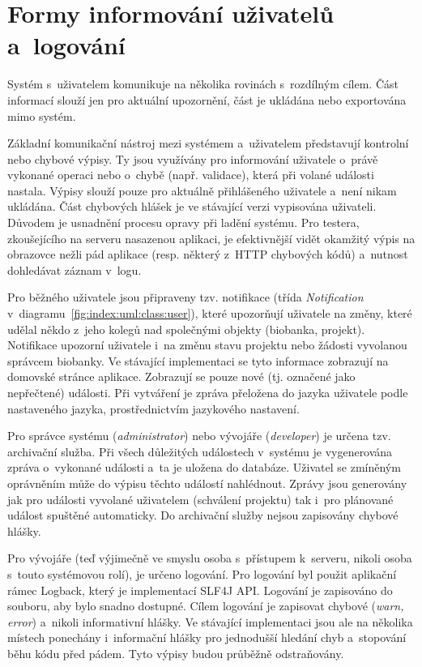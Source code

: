 \documentclass[11pt,draft,oneside]{fithesis2}
\begin{document}
\section{Formy informování uživatelů a~logování}
Systém s~uživatelem komunikuje na několika rovinách s~rozdílným cílem. Část informací slouží jen pro aktuální upozornění, část je ukládána nebo exportována mimo systém.

Základní komunikační nástroj mezi systémem a~uživatelem představují kontrolní nebo chybové výpisy. Ty jsou využívány pro informování uživatele o~právě vykonané operaci nebo o~chybě (např. validace), která při volané události nastala. Výpisy slouží pouze pro aktuálně přihlášeného uživatele a~není nikam ukládána. Část chybových hlášek je ve stávající verzi vypisována uživateli. Důvodem je usnadnění procesu opravy při ladění systému. Pro testera, zkoušejícího na serveru nasazenou aplikaci, je efektivnější vidět okamžitý výpis na obrazovce nežli pád aplikace (resp. některý z~HTTP chybových kódů) a~nutnost dohledávat záznam v~logu.

Pro běžného uživatele jsou připraveny tzv. notifikace (třída \textit{Notification} v~diagramu~\ref{fig:index:uml:class:user}), které upozorňují uživatele na změny, které udělal někdo z~jeho kolegů nad společnými objekty (biobanka, projekt). Notifikace upozorní uživatele i~na změnu stavu projektu nebo žádosti vyvolanou správcem biobanky. Ve stávající implementaci se tyto informace zobrazují na domovské stránce aplikace. Zobrazují se pouze nové (tj. označené jako nepřečtené) události. Při vytváření je zpráva přeložena do jazyka uživatele podle nastaveného jazyka, prostřednictvím jazykového nastavení.

Pro správce systému (\textit{administrator}) nebo vývojáře (\textit{developer}) je určena tzv. archivační služba. Při všech důležitých událostech v~systému je vygenerována zpráva o~vykonané události a~ta je uložena do databáze. Uživatel se zmíněným oprávněním může do výpisu těchto událostí nahlédnout. Zprávy jsou generovány jak pro události vyvolané uživatelem (schválení projektu) tak i~pro plánované událost spuštěné automaticky. Do archivační služby nejsou zapisovány chybové hlášky.

Pro vývojáře (teď výjimečně ve smyslu osoba s~přístupem k~serveru, nikoli osoba s~touto systémovou rolí), je určeno logování. Pro logování byl použit aplikační rámec Logback, který je implementací SLF4J API. Logování je zapisováno do souboru, aby bylo snadno dostupné. Cílem logování je zapisovat chybové (\textit{warn, error}) a~nikoli informativní hlášky. Ve stávající implementaci jsou ale na několika místech ponechány i~informační hlášky pro jednodušší hledání chyb a~stopování běhu kódu před pádem. Tyto výpisy budou průběžně odstraňovány.
\end{document}
